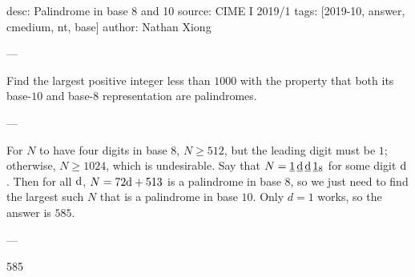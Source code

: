 desc: Palindrome in base 8 and 10
source: CIME I 2019/1
tags: [2019-10, answer, cmedium, nt, base]
author: Nathan Xiong

---

Find the largest positive integer less than $1000$ with the property that both its base-$10$ and base-$8$ representation are palindromes.

---

For $N$ to have four digits in base $8$, $N\ge512$, but the leading digit must be $1$; otherwise, $N\ge1024$, which is undesirable. Say that $N=\underline1\,\underline{\text d}\,\underline{\text d}\,\underline1{}_8$ for some digit $\text d$. Then for all $\text d$, $N=72\text d+513$ is a palindrome in base $8$, so we just need to find the largest such $N$ that is a palindrome in base $10$. Only $d=1$ works, so the answer is $585$.

---

585
